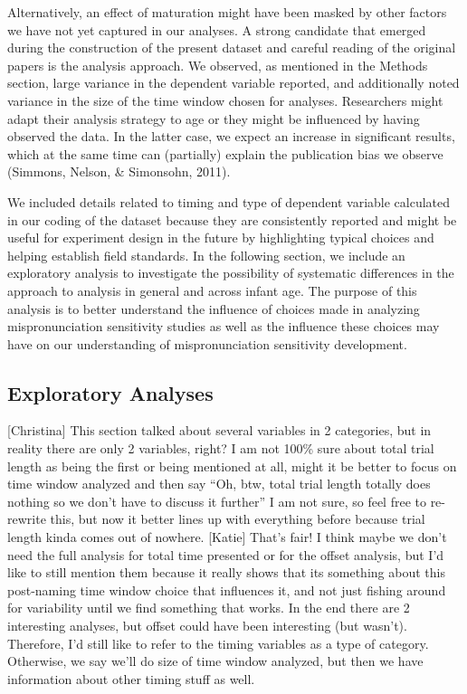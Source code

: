 \documentclass[man]{apa6}
\theoremstyle{definition}
\theoremstyle{definition}
\theoremstyle{definition}
\theoremstyle{remark}
\begin{document}
Alternatively, an effect of maturation might have been masked by other
factors we have not yet captured in our analyses. A strong candidate
that emerged during the construction of the present dataset and careful
reading of the original papers is the analysis approach. We observed, as
mentioned in the Methods section, large variance in the dependent
variable reported, and additionally noted variance in the size of the
time window chosen for analyses. Researchers might adapt their analysis
strategy to age or they might be influenced by having observed the data.
In the latter case, we expect an increase in significant results, which
at the same time can (partially) explain the publication bias we observe
(Simmons, Nelson, \& Simonsohn, 2011).

We included details related to timing and type of dependent variable
calculated in our coding of the dataset because they are consistently
reported and might be useful for experiment design in the future by
highlighting typical choices and helping establish field standards. In
the following section, we include an exploratory analysis to investigate
the possibility of systematic differences in the approach to analysis in
general and across infant age. The purpose of this analysis is to better
understand the influence of choices made in analyzing mispronunciation
sensitivity studies as well as the influence these choices may have on
our understanding of mispronunciation sensitivity development.

\subsection{Exploratory Analyses}\label{exploratory-analyses}

{[}Christina{]} This section talked about several variables in 2
categories, but in reality there are only 2 variables, right? I am not
100\% sure about total trial length as being the first or being
mentioned at all, might it be better to focus on time window analyzed
and then say \enquote{Oh, btw, total trial length totally does nothing
so we don't have to discuss it further} I am not sure, so feel free to
re-rewrite this, but now it better lines up with everything before
because trial length kinda comes out of nowhere. {[}Katie{]} That's
fair! I think maybe we don't need the full analysis for total time
presented or for the offset analysis, but I'd like to still mention them
because it really shows that its something about this post-naming time
window choice that influences it, and not just fishing around for
variability until we find something that works. In the end there are 2
interesting analyses, but offset could have been interesting (but
wasn't). Therefore, I'd still like to refer to the timing variables as a
type of category. Otherwise, we say we'll do size of time window
analyzed, but then we have information about other timing stuff as well.
\end{document}
